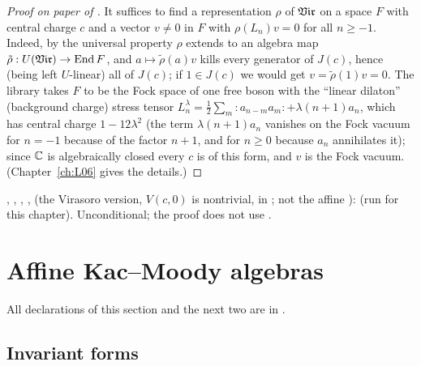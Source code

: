 \begin{proof}[Proof on paper of ]
It suffices to find a representation $\rho$ of $\mathfrak{Vir}$ on a space $F$ with central charge $c$
and a vector $v\ne0$ in $F$ with $\rho(L_n)v = 0$ for all $n\ge-1$. Indeed, by the universal property
$\rho$ extends to an algebra map $\tilde\rho : U(\mathfrak{Vir})\to\operatorname{End} F$, and $a\mapsto\tilde\rho(a)v$
kills every generator of $J(c)$, hence (being left $U$-linear) all of $J(c)$; if $1\in J(c)$ we
would get $v = \tilde\rho(1)v = 0$. The library takes $F$ to be the Fock space of one free boson
with the ``linear dilaton'' (background charge) stress tensor
$L^\lambda_n = \frac12\sum_m{:}a_{n-m}a_m{:} + \lambda(n+1)a_n$, which has central charge
$1-12\lambda^2$ (the term $\lambda(n+1)a_n$ vanishes on the Fock vacuum for $n=-1$ because of the factor
$n+1$, and for $n\ge0$ because $a_n$ annihilates it); since ${\mathbb{C}}$ is algebraically closed every $c$ is of this
form, and $v$ is the Fock vacuum. (Chapter~\ref{ch:L06} gives the details.)
\end{proof}

\begin{status}
\allowbreak{}\allowbreak{}\allowbreak{}\allowbreak{}, \allowbreak{}\allowbreak{}\allowbreak{}\allowbreak{},
\allowbreak{}\allowbreak{}\allowbreak{}, \allowbreak{}, \allowbreak{}\allowbreak{} (the Virasoro version, $V(c,0)$ is nontrivial,
in ; not the affine ):
 (run for this chapter). Unconditional; the
proof does not use .
\end{status}

\section{Affine Kac--Moody algebras}\label{l02:sec:affine}

All declarations of this section and the next two are in
.

\subsection{Invariant forms}

